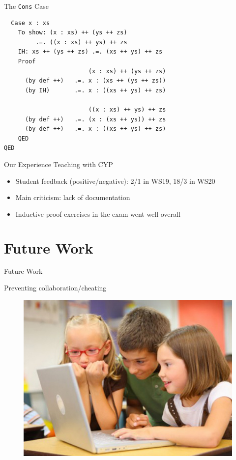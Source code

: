\documentclass{beamer}
\begin{document}
\begin{frame}[fragile]{The \texttt{Cons} Case}
  \begin{lstlisting}
  Case x : xs
    To show: (x : xs) ++ (ys ++ zs)
         .=. ((x : xs) ++ ys) ++ zs
    IH: xs ++ (ys ++ zs) .=. (xs ++ ys) ++ zs
    Proof
                        (x : xs) ++ (ys ++ zs)
      (by def ++)   .=. x : (xs ++ (ys ++ zs))
      (by IH)       .=. x : ((xs ++ ys) ++ zs)

                        ((x : xs) ++ ys) ++ zs
      (by def ++)   .=. (x : (xs ++ ys)) ++ zs
      (by def ++)   .=. x : ((xs ++ ys) ++ zs)
    QED
QED
  \end{lstlisting}
\end{frame}

\begin{frame}[fragile]{Our Experience Teaching with CYP}
\begin{itemize}[<+->]
  \item Student feedback (positive/negative): 2/1 in WS19, 18/3 in WS20
  \item Main criticism: lack of documentation
  \item Inductive proof exercises in the exam went well overall
\end{itemize}
\end{frame}

\section{Future Work}

\begin{frame}{Future Work}
\centerline{Preventing collaboration/cheating}
\begin{figure}
\includegraphics[width=0.85\linewidth]{assets/group}
\end{figure}
\end{frame}
\end{document}
